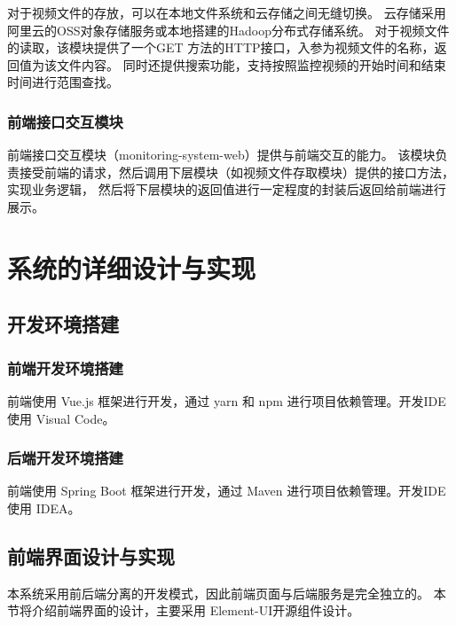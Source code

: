 对于视频文件的存放，可以在本地文件系统和云存储之间无缝切换。
云存储采用阿里云的OSS对象存储服务或本地搭建的Hadoop分布式存储系统。
对于视频文件的读取，该模块提供了一个GET 方法的HTTP接口，入参为视频文件的名称，返回值为该文件内容。
同时还提供搜索功能，支持按照监控视频的开始时间和结束时间进行范围查找。


\subsection{前端接口交互模块}
前端接口交互模块（monitoring-system-web）提供与前端交互的能力。
该模块负责接受前端的请求，然后调用下层模块（如视频文件存取模块）提供的接口方法，实现业务逻辑，
然后将下层模块的返回值进行一定程度的封装后返回给前端进行展示。








\chapter{系统的详细设计与实现}
\section{开发环境搭建}
\subsection{前端开发环境搭建}
前端使用 Vue.js 框架进行开发，通过 yarn 和 npm 进行项目依赖管理。开发IDE使用 Visual Code。 

\subsection{后端开发环境搭建}
前端使用 Spring Boot 框架进行开发，通过 Maven 进行项目依赖管理。开发IDE使用 IDEA。 

\section{前端界面设计与实现}
本系统采用前后端分离的开发模式，因此前端页面与后端服务是完全独立的。
本节将介绍前端界面的设计，主要采用 Element-UI开源组件设计。

